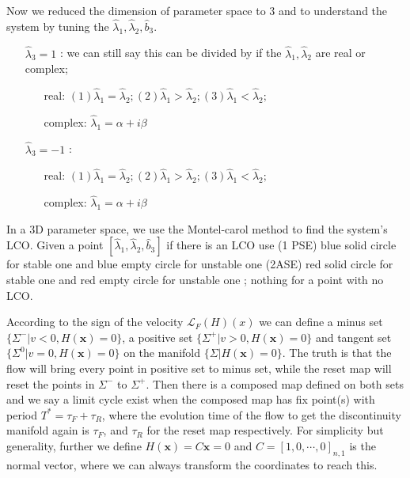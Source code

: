 \documentclass[a4paper,10pt]{article}
\begin{document}
Now we reduced the dimension of parameter space to $3$ and to understand the system by tuning the $\hat{\lambda}_1, \hat{\lambda}_2,  \hat{b}_3$.
\begin{enumerate}
	\item[$\hat{\lambda}_3 = 1$]: we can still say this can be divided by if the $\hat{\lambda}_1, \hat{\lambda}_2$ are real or complex;
	\begin{itemize}
		 \item[real:]  $ (1)\hat{\lambda}_1 = \hat{\lambda}_2; (2) \hat{\lambda}_1 > \hat{\lambda}_2; (3) \hat{\lambda}_1 < \hat{\lambda}_2;$ 
		 \item[complex:] $\hat{\lambda}_1 = \alpha + i \beta$
	\end{itemize}
	\item[$\hat{\lambda}_3 = -1$]: 
	\begin{itemize}
		\item[real:]  $ (1)\hat{\lambda}_1 = \hat{\lambda}_2; (2) \hat{\lambda}_1 > \hat{\lambda}_2; (3) \hat{\lambda}_1 < \hat{\lambda}_2;$ 
		\item[complex:] $\hat{\lambda}_1 = \alpha + i \beta$
	\end{itemize}

\end{enumerate}
In a 3D parameter space, we use the Montel-carol method to find the system's LCO. Given a point $[\hat{\lambda}_1, \hat{\lambda}_2,  \hat{b}_3]$ if there is an LCO use (1 PSE) blue solid circle for stable one and blue empty circle for unstable one (2ASE) red solid circle for stable one and red empty circle for unstable one ; nothing for a point with no LCO.


	According to the sign of the velocity $\mathcal{L}_F(H)(x)$ we can define a minus set $\{\Sigma^-|v<0,H(\mathbf{x}) = 0\}$, a positive set $\{\Sigma^+|v>0,H(\mathbf{x}) = 0\}$ and tangent set $\{\Sigma^0|v=0,H(\mathbf{x}) = 0\}$ on the manifold $\{\Sigma|H(\mathbf{x}) = 0\}$. The truth is that the flow will bring every point in positive set to minus set, while the reset map will reset the points in $\Sigma^-$ to $\Sigma^+$. Then there is a composed map defined on both sets and we say a limit cycle exist when the composed map has fix point(s) with period $T^* = \tau_F + \tau_R$, where the evolution time of the flow to get the discontinuity manifold again is $\tau_F$, and $\tau_R$ for the reset map respectively. 
	For simplicity but generality, further we define $H(\mathbf{x}) = C \mathbf{x} =0$ and $C = [1,0,\cdots,0]_{n,1}$ is the normal vector, where we can  always transform the coordinates to reach this.  
	
\end{document}
